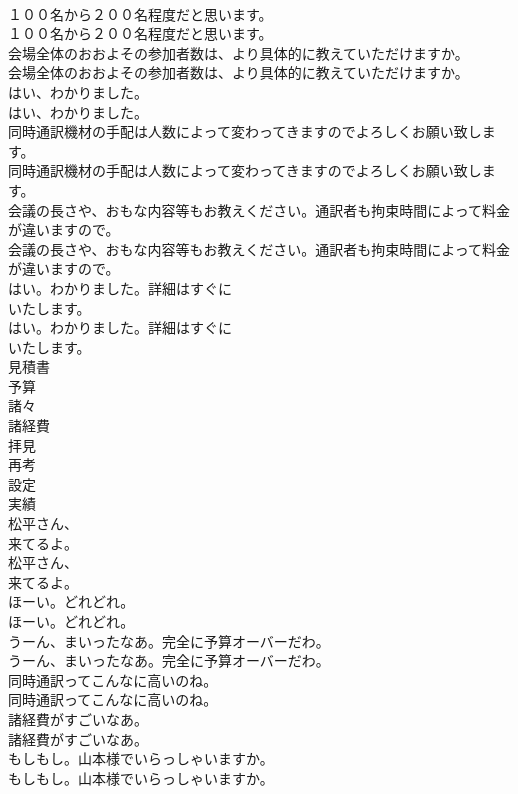 \documentclass[8pt]{extreport}
\begin{document}
\begin{CJK}{UTF8}{min}
\\	１００名から２００名程度だと思います。	
\\	１００名から２００名程度だと思います。 
\\	会場全体のおおよその参加者数は、より具体的に教えていただけますか。	
\\	会場全体のおおよその参加者数は、より具体的に教えていただけますか。 
\\	はい、わかりました。	
\\	はい、わかりました。 
\\	同時通訳機材の手配は人数によって変わってきますのでよろしくお願い致します。	
\\	同時通訳機材の手配は人数によって変わってきますのでよろしくお願い致します。 
\\	会議の長さや、おもな内容等もお教えください。通訳者も拘束時間によって料金が違いますので。	
\\	会議の長さや、おもな内容等もお教えください。通訳者も拘束時間によって料金が違いますので。 
\\	はい。わかりました。詳細はすぐに
\\	いたします。	
\\	はい。わかりました。詳細はすぐに
\\	いたします。 
\\	見積書
\\	予算
\\	諸々
\\	諸経費
\\	拝見
\\	再考
\\	設定
\\	実績
\\	松平さん、
\\	来てるよ。	
\\	松平さん、
\\	来てるよ。 
\\	ほーい。どれどれ。	
\\	ほーい。どれどれ。 
\\	うーん、まいったなあ。完全に予算オーバーだわ。	
\\	うーん、まいったなあ。完全に予算オーバーだわ。 
\\	同時通訳ってこんなに高いのね。	
\\	同時通訳ってこんなに高いのね。 
\\	諸経費がすごいなあ。	
\\	諸経費がすごいなあ。 
\\	もしもし。山本様でいらっしゃいますか。	
\\	もしもし。山本様でいらっしゃいますか。 

\end{CJK}
\end{document}
